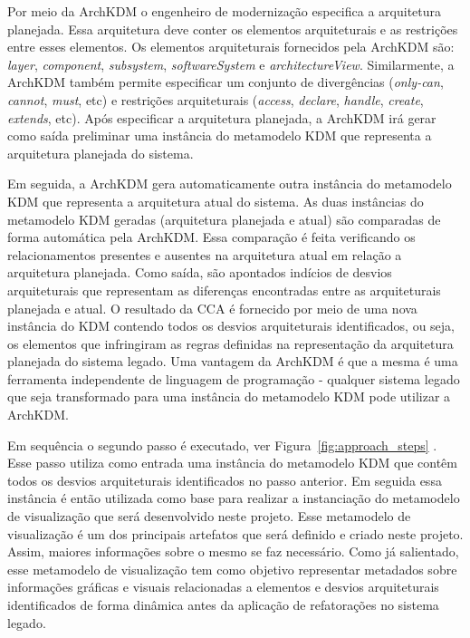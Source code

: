 \documentclass[12pt]{article}
\begin{document}
Por meio da ArchKDM o engenheiro de modernização especifica a arquitetura planejada. Essa arquitetura deve conter os elementos arquiteturais e as restrições entre esses elementos. Os elementos arquiteturais fornecidos pela ArchKDM são: \textit{layer}, \textit{component}, \textit{subsystem}, \textit{softwareSystem} e \textit{architectureView}. Similarmente, a ArchKDM também permite especificar um conjunto de divergências (\textit{only-can}, \textit{cannot}, \textit{must}, etc) e restrições arquiteturais (\textit{access}, \textit{declare}, \textit{handle}, \textit{create}, \textit{extends}, etc). Após especificar a arquitetura planejada, a ArchKDM irá gerar como saída preliminar uma instância do metamodelo KDM que representa a arquitetura planejada do sistema.  

Em seguida, a ArchKDM gera automaticamente outra instância do metamodelo KDM que representa a arquitetura atual do sistema.  As duas instâncias do metamodelo KDM geradas (arquitetura planejada e atual) são comparadas de forma automática pela ArchKDM. Essa comparação é feita verificando os relacionamentos presentes e ausentes na arquitetura atual em relação a arquitetura planejada. Como saída, são apontados indícios de desvios arquiteturais que representam as diferenças encontradas entre as arquiteturais planejada e atual. O resultado da CCA é fornecido por meio de uma nova instância do KDM contendo todos os desvios arquiteturais identificados, ou seja, os elementos que infringiram as regras definidas na representação da arquitetura planejada do sistema legado. Uma vantagem da ArchKDM é que a mesma é uma ferramenta independente de linguagem de programação - qualquer sistema legado que seja transformado para uma instância do metamodelo KDM pode utilizar a ArchKDM.

Em sequência o segundo passo é executado, ver Figura~\ref{fig:approach_steps} . Esse passo utiliza como entrada uma instância do metamodelo KDM que contêm todos os desvios arquiteturais identificados no passo anterior. Em seguida essa instância é então utilizada como base para realizar a instanciação do metamodelo de visualização que será desenvolvido neste projeto. Esse metamodelo de visualização é um dos principais artefatos que será definido e criado neste projeto. Assim, maiores informações sobre o mesmo se faz necessário. Como já salientado, esse metamodelo de visualização tem como objetivo representar metadados sobre informações gráficas e visuais relacionadas a elementos e desvios arquiteturais identificados de forma dinâmica antes da aplicação de refatorações no sistema legado. 
\end{document}
